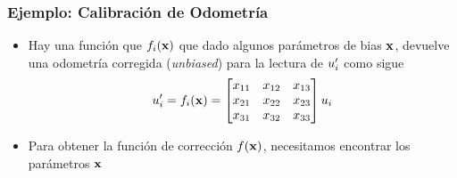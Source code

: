 \begin{frame}
    \frametitle{Ejemplo: Calibración de Odometría}
    
    \begin{itemize}
        \item Hay una función que $f_{i}(\boldsymbol{\mathbf{x}})$ que dado algunos parámetros de bias $\boldsymbol{\mathbf{x}}$, devuelve una odometría corregida (\emph{unbiased}) para la lectura de $u_{i}^{\prime}$ como sigue
        \begin{equation*}
            u_{i}^{\prime} = f_{i}(\boldsymbol{\mathbf{x}}) =
            \begin{bmatrix}
                x_{11} & x_{12} & x_{13} \\
                x_{21} & x_{22} & x_{23} \\
                x_{31} & x_{32} & x_{33}
            \end{bmatrix}
            u_{i}
        \end{equation*}
    \item Para obtener la función de corrección $f(\boldsymbol{\mathbf{x}})$, necesitamos encontrar los parámetros $\boldsymbol{\mathbf{x}}$
    \end{itemize}
    
\end{frame}

